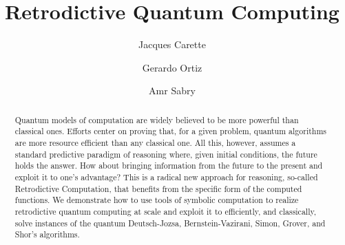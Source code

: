 \documentclass[aps,prl,twocolumn,superscriptaddress,floatfix,notitlepage]{revtex4-2}
\begin{document}
\title{Retrodictive Quantum Computing}

\begin{abstract}
Quantum models of computation are widely believed to be more powerful
than classical ones. Efforts center on proving that, for a given
problem, quantum algorithms are more resource efficient than any
classical one. All this, however, assumes a standard predictive
paradigm of reasoning where, given initial conditions, the future
holds the answer. How about bringing information from the future to
the present and exploit it to one's advantage? This is a radical new
approach for reasoning, so-called Retrodictive Computation, that
benefits from the specific form of the computed functions. We
demonstrate how to use tools of symbolic computation to realize
retrodictive quantum computing at scale and exploit it to efficiently,
and classically, solve instances of the quantum Deutsch-Jozsa,
Bernstein-Vazirani, Simon, Grover, and Shor's algorithms.
\end{abstract}

\author{Jacques Carette }
\author{Gerardo Ortiz }
\author{Amr Sabry }

\maketitle
\end{document}
